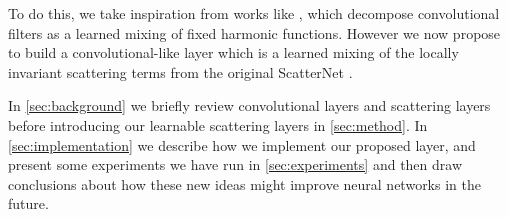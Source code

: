 To do this, we take inspiration from works like \cite{qiu_dcfnet:_2018,
jacobsen_dynamic_2017, worrall_harmonic_2017, cotter_deep_2018},
which decompose convolutional filters as a learned mixing of fixed harmonic
functions. However we now propose to build a
convolutional-like layer which is a learned mixing of the locally invariant
scattering terms from the original ScatterNet \cite{bruna_invariant_2013}.

In \autoref{sec:background} we briefly review convolutional layers and scattering
layers before introducing our learnable scattering layers in \autoref{sec:method}.
In \autoref{sec:implementation} we describe how we implement our proposed layer,
and present some experiments we have run in \autoref{sec:experiments} and then
draw conclusions about how these new ideas might improve neural networks in the
future.
